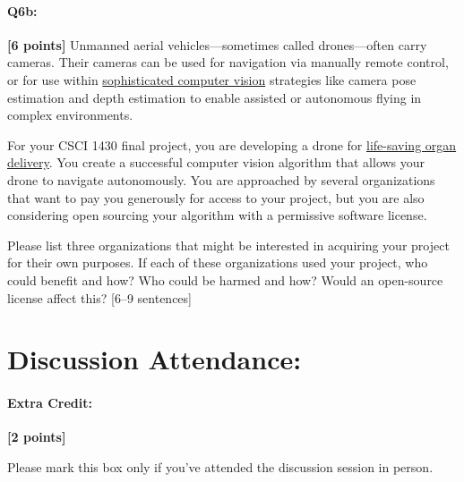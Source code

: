 \pagebreak
\paragraph{Q6b:} \textbf{[6 points]} Unmanned aerial vehicles---sometimes called drones---often carry cameras. Their cameras can be used for navigation via manually remote control, or for use within \href{https://link.springer.com/article/10.1007/s10846-017-0483-z}{sophisticated computer vision} strategies like camera pose estimation and depth estimation to enable assisted or autonomous flying in complex environments.

For your CSCI 1430 final project, you are developing a drone for \href{https://www.cnn.com/2019/05/01/health/drone-organ-transplant-bn-trnd/index.html}{life-saving organ delivery}. You create a successful computer vision algorithm that allows your drone to navigate autonomously. You are approached by several organizations that want to pay you generously for access to your project, but you are also considering open sourcing your algorithm with a permissive software license.

\begin{tcolorbox}[colback=orange!5!white,colframe=orange!75!black]
Please list three organizations that might be interested in acquiring your project for their own purposes. If each of these organizations used your project, who could benefit and how? Who could be harmed and how? Would an open-source license affect this? [6–9 sentences]
\end{tcolorbox}


\pagebreak
\section*{Discussion Attendance:}
\paragraph{Extra Credit:} \textbf{[2 points]}

Please mark this box only if you've attended the discussion session in person.

